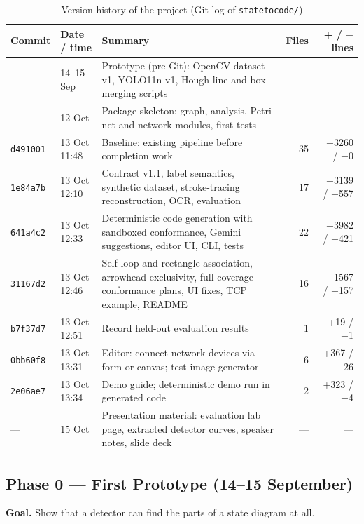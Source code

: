 \documentclass[journal,10pt]{IEEEtran}
\newcommand{\code}[1]{\texttt{#1}}
\begin{document}
\begin{table}[t]
\centering
\caption{Version history of the project (Git log of \code{statetocode/})}
\label{tab:commits}
\footnotesize
\begin{tabular}{@{}llL{9.3cm}rr@{}}
\toprule
\textbf{Commit} & \textbf{Date / time} & \textbf{Summary} & \textbf{Files} & \textbf{+ / $-$ lines} \\
\midrule
--- & 14--15 Sep & Prototype (pre-Git): OpenCV dataset v1, YOLO11n v1, Hough-line and
box-merging scripts & --- & --- \\
--- & 12 Oct & Package skeleton: graph, analysis, Petri-net and network modules, first tests
& --- & --- \\
\code{d491001} & 13 Oct 11:48 & Baseline: existing pipeline before completion work & 35 &
+3260 / $-$0 \\
\code{1e84a7b} & 13 Oct 12:10 & Contract v1.1, label semantics, synthetic dataset,
stroke-tracing reconstruction, OCR, evaluation & 17 & +3139 / $-$557 \\
\code{641a4c2} & 13 Oct 12:33 & Deterministic code generation with sandboxed conformance,
Gemini suggestions, editor UI, CLI, tests & 22 & +3982 / $-$421 \\
\code{31167d2} & 13 Oct 12:46 & Self-loop and rectangle association, arrowhead exclusivity,
full-coverage conformance plans, UI fixes, TCP example, README & 16 & +1567 / $-$157 \\
\code{b7f37d7} & 13 Oct 12:51 & Record held-out evaluation results & 1 & +19 / $-$1 \\
\code{0bb60f8} & 13 Oct 13:31 & Editor: connect network devices via form or canvas; test
image generator & 6 & +367 / $-$26 \\
\code{2e06ae7} & 13 Oct 13:34 & Demo guide; deterministic demo run in generated code & 2 &
+323 / $-$4 \\
--- & 15 Oct & Presentation material: evaluation lab page, extracted detector curves,
speaker notes, slide deck & --- & --- \\
\bottomrule
\end{tabular}
\end{table}

\subsection{Phase 0 --- First Prototype (14--15 September)}
\textbf{Goal.} Show that a detector can find the parts of a state diagram at all.
\end{document}

